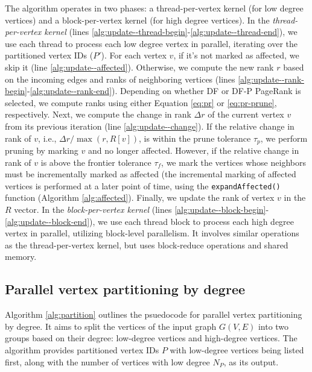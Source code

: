 The algorithm operates in two phases: a thread-per-vertex kernel (for low degree vertices) and a block-per-vertex kernel (for high degree vertices). In the \textit{thread-per-vertex kernel} (lines \ref{alg:update--thread-begin}-\ref{alg:update--thread-end}), we use each thread to process each low degree vertex in parallel, iterating over the partitioned vertex IDs ($P'$). For each vertex $v$, if it's not marked as affected, we skip it (line \ref{alg:update--affected}). Otherwise, we compute the new rank $r$ based on the incoming edges and ranks of neighboring vertices (lines \ref{alg:update--rank-begin}-\ref{alg:update--rank-end}). Depending on whether DF or DF-P PageRank is selected, we compute ranks using either Equation \ref{eq:pr} or \ref{eq:pr-prune}, respectively. Next, we compute the change in rank $\Delta r$ of the current vertex $v$ from its previous iteration (line \ref{alg:update--change}). If the relative change in rank of $v$, i.e., $\Delta r / \max(r, R[v])$, is within the prune tolerance $\tau_p$, we perform pruning by marking $v$ and no longer affected. However, if the relative change in rank of $v$ is above the frontier tolerance $\tau_f$, we mark the vertices whose neighbors must be incrementally marked as affected (the incremental marking of affected vertices is performed at a later point of time, using the \texttt{expandAffected()} function (Algorithm \ref{alg:affected}). Finally, we update the rank of vertex $v$ in the $R$ vector. In the \textit{block-per-vertex kernel} (lines \ref{alg:update--block-begin}-\ref{alg:update--block-end}), we use each thread block to process each high degree vertex in parallel, utilizing block-level parallelism. It involves similar operations as the thread-per-vertex kernel, but uses block-reduce operations and shared memory.




\subsection{Parallel vertex partitioning by degree}
\label{sec:partition}

Algorithm \ref{alg:partition} outlines the psuedocode for parallel vertex partitioning by degree. It aims to split the vertices of the input graph $G(V, E)$ into two groups based on their degree: low-degree vertices and high-degree vertices. The algorithm provides partitioned vertex IDs $P$ with low-degree vertices being listed first, along with the number of vertices with low degree $N_P$, as its output.

